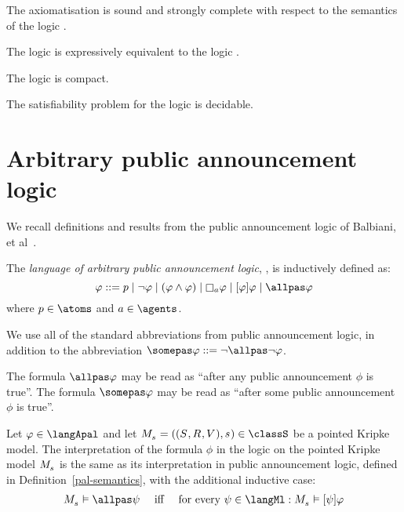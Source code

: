 \begin{proposition}
The axiomatisation \axiomPalS{} is sound and strongly complete with respect to the semantics of the logic \logicPalS{}.
\end{proposition}

\begin{proposition}
The logic \logicPalS{} is expressively equivalent to the logic \logicS{}.
\end{proposition}

\begin{proposition}
The logic \logicPalS{} is compact.
\end{proposition}

\begin{proposition}
The satisfiability problem for the logic \logicPalS{} is decidable.
\end{proposition}

\section{Arbitrary public announcement logic}\label{apal}

We recall definitions and results from the public announcement logic of Balbiani, et al~\cite{balbianietal:2008}.

\begin{definition}
The {\em language of arbitrary public announcement logic}, \langApal{}, is inductively defined as:
$$
\phi ::= 
    \atomP \mid
    \lnot \phi \mid
    (\phi \land \phi) \mid
    \necessaryA \phi \mid
    \announceA{\phi} \phi \mid
    \allpas \phi
$$
where $\atomP \in \atoms$ and $\agentA \in \agents$.
\end{definition}

We use all of the standard abbreviations from public announcement logic, in addition to the abbreviation $\somepas \phi ::= \lnot \allpas \lnot \phi$.

The formula $\allpas \phi$ may be read as ``after any public announcement $\phi$ is true''.
The formula $\somepas \phi$ may be read as ``after some public announcement $\phi$ is true''.

\begin{definition}
Let $\phi \in \langApal$ and let $\kPModelAndTuple{\kStateS} \in \classS$ be a pointed Kripke model.
The interpretation of the formula $\phi$ in the logic \logicApalS{} on the pointed Kripke model $\kPModel{\kStateS}$ is the same as its interpretation in public announcement logic, defined in Definition~\ref{pal-semantics}, with the additional inductive case:
$$
\begin{array}{lcl}
    \kPModel{\kStateS} \entails \allpas \psi & \text{ iff } & \text{for every } \psi \in \langMl : \kPModel{\kStateS} \entails \announceA{\psi} \phi
\end{array}
$$
\end{definition}

